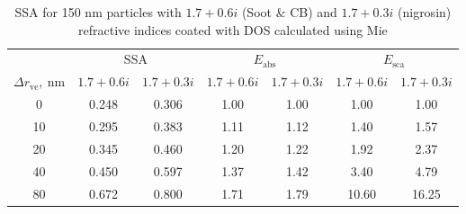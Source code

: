 \documentclass[12pt]{article}
\begin{document}
\begin{table}[!ht]
    \centering
    \caption{SSA for 150 nm particles with $1.7+0.6i$ (Soot \& CB) and $1.7+0.3i$ (nigrosin) refractive indices coated with DOS calculated using Mie}
    \begin{tabular}{c c c c c c c}
        \hline
        & \multicolumn{2}{c}{SSA} & \multicolumn{2}{c}{$E_\mathrm{abs}$} & \multicolumn{2}{c}{$E_\mathrm{sca}$} \\
        $\Delta r_{\mathrm{ve}},\ \mathrm{nm}$ & $1.7+0.6i$ & $1.7+0.3i$ & $1.7+0.6i$ & $1.7+0.3i$ & $1.7+0.6i$ & $1.7+0.3i$ \\
        \hline
        0 & 0.248 & 0.306 & 1.00 & 1.00 & 1.00 & 1.00\\
        10 & 0.295 & 0.383 & 1.11 & 1.12 & 1.40 & 1.57\\
        20 & 0.345 & 0.460 & 1.20 & 1.22 & 1.92 & 2.37\\
        40 & 0.450 & 0.597 & 1.37 & 1.42 & 3.40 & 4.79\\
        80 & 0.672 & 0.800 & 1.71 & 1.79 & 10.60 & 16.25\\
        \hline
    \end{tabular}
    \label{tab:ssa}
\end{table}




 

\end{document}
